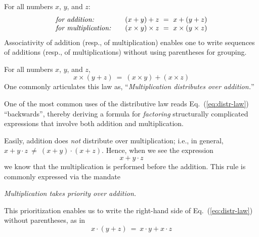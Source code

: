 \medskip

 

For all numbers $x$, $y$, and $z$:
\[
\begin{array}{llc}
\mbox{\it for addition:}
  & &
(x+y)+z \ = \ x+(y+z) \\
\mbox{\it for multiplication:}
  & & 
(x \times y) \times z \ = \ x \times (y \times z)
\end{array}
\] 
Associativity of addition (resp., of multiplication) enables one to write sequences of additions (resp., of multiplications) without using parentheses for grouping.

\medskip

 

For all numbers $x$, $y$, and $z$,
\begin{equation}
\label{eq:distr-law}
x \times (y + z) \ = \ (x \times y) + (x \times z)
\end{equation}
One commonly articulates this law as, ``{\em Multiplication distributes over addition.}''

\smallskip


One of the most common uses of the distributive law reads Eq.~(\ref{eq:distr-law}) ``backwards'', thereby deriving a formula for {\em factoring} structurally complicated expressions that involve both addition and multiplication.

\smallskip

Easily, addition does {\em not} distribute over multiplication; i.e., in general, $x + y \cdot z \ \neq \ (x+y) \cdot (x+z)$.  Hence, when we see the expression
\[ x + y \cdot z \]
we know that the multiplication is performed before the addition.  This rule is commonly expressed via the mandate

\smallskip

{\em Multiplication takes priority over addition.}

\smallskip

\noindent This prioritization enables us to write the right-hand side of Eq.~(\ref{eq:distr-law}) without parentheses, as in
\[ x \cdot (y + z) \ = \ x \cdot y + x \cdot z \]

\medskip

